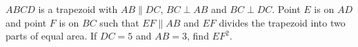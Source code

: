 $ABCD$ is a trapezoid with $AB\parallel DC$, $BC\perp AB$ and $BC\perp DC$. Point $E$ is on $AD$ and point $F$ is on $BC$ such that $EF\parallel AB$ and $EF$ divides the trapezoid into two parts of equal area. If $DC=5$ and $AB=3$, find $EF^2$.
